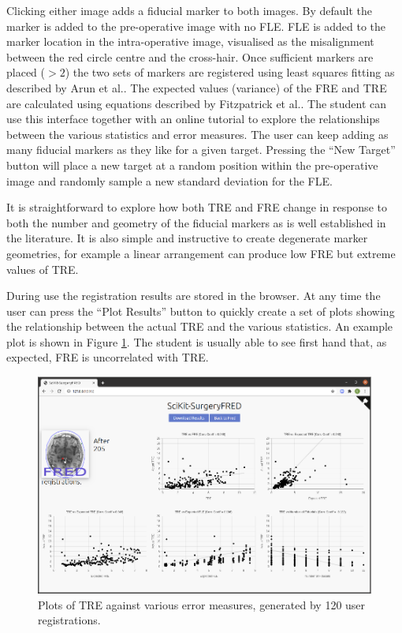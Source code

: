 Clicking either image adds a fiducial marker to both images. By default the marker is added to the pre-operative image 
with no \gls{FLE}. \gls{FLE} is added to the marker location in the intra-operative image, visualised as the misalignment
between the red circle centre and the cross-hair. Once sufficient markers are placed ($>2$) the two sets of markers are registered using least squares fitting as described by Arun et al.\cite{Arun1987}. The expected values (variance) of the \gls{FRE} and \gls{TRE} are calculated 
using equations described by Fitzpatrick et al.\cite{Fitzpatrick1998}. The student can use this interface together with an 
online tutorial 
to explore the relationships between the various statistics and error measures. The
user can keep adding as many fiducial markers as they like for a given target. 
Pressing the ``New Target'' button will place a new target at a random position 
within the pre-operative image and randomly sample a new standard deviation for the
\gls{FLE}.

It is straightforward to explore how both \gls{TRE} and \gls{FRE} change in response to 
both the number and geometry of the fiducial markers as is well established in the literature\cite{1295074, Fitzpatrick1998}. 
It is
also simple and instructive to create degenerate marker geometries, for example 
a linear arrangement can produce low \gls{FRE} but extreme values of \gls{TRE}.

During use the registration results are 
stored in the browser. At any time the user can press the ``Plot Results'' button to quickly create a set of 
plots showing the relationship between the actual \gls{TRE} and the various statistics. 
An example plot is shown in Figure \ref{fig:correlation}. 
The student is usually able to see first hand that, as expected, \gls{FRE} is uncorrelated with \gls{TRE}. 

\begin{figure}
	\begin{center}
	\includegraphics[width=0.9\linewidth]{images/default.eps}
		\caption{\label{fig:correlation}Plots of TRE against various error measures, generated by 
		120 user registrations.}
	\end{center}
\end{figure}


